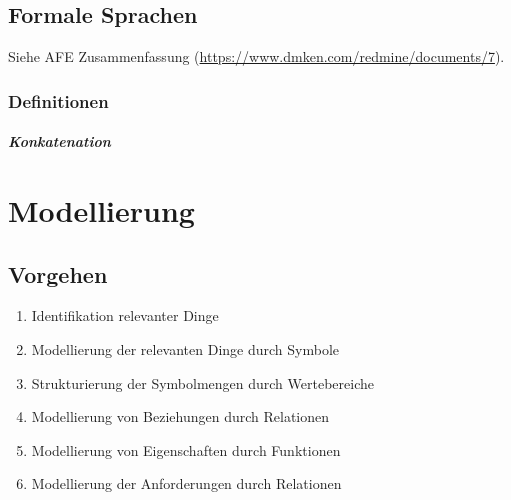 						\section{Formale Sprachen}
							Siehe AFE Zusammenfassung (\url{https://www.dmken.com/redmine/documents/7}).

							\subsection{Definitionen}
								\paragraph{Konkatenation}



					\chapter{Modellierung}
						\section{Vorgehen}
							\begin{enumerate}
								\item Identifikation relevanter Dinge
								\item Modellierung der relevanten Dinge durch Symbole
								\item Strukturierung der Symbolmengen durch Wertebereiche
								\item Modellierung von Beziehungen durch Relationen
								\item Modellierung von Eigenschaften durch Funktionen
								\item Modellierung der Anforderungen durch Relationen
							\end{enumerate}

